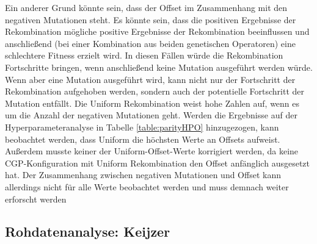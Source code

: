Ein anderer Grund könnte sein, dass der Offset im Zusammenhang mit den negativen Mutationen steht.
Es könnte sein, dass die positiven Ergebnisse der Rekombination mögliche positive Ergebnisse der Rekombination beeinflussen und anschließend (bei einer Kombination aus beiden genetischen Operatoren) eine schlechtere Fitness erzielt wird.
In diesen Fällen würde die Rekombination Fortschritte bringen, wenn anschließend keine Mutation ausgeführt werden würde.
Wenn aber eine Mutation ausgeführt wird, kann nicht nur der Fortschritt der Rekombination aufgehoben werden, sondern auch der potentielle Fortschritt der Mutation entfällt.
Die Uniform Rekombination weist hohe Zahlen auf, wenn es um die Anzahl der negativen Mutationen geht. 
Werden die Ergebnisse auf der Hyperparameteranalyse in Tabelle \ref{table:parityHPO} hinzugezogen, kann beobachtet werden, dass Uniform die höchsten Werte an Offsets aufweist.
Außerdem musste keiner der Uniform-Offset-Werte korrigiert werden, da keine CGP-Konfiguration mit Uniform Rekombination den Offset anfänglich ausgesetzt hat.
Der Zusammenhang zwischen negativen Mutationen und Offset kann allerdings nicht für alle Werte beobachtet werden und muss demnach weiter erforscht werden

\subsection{Rohdatenanalyse: Keijzer}
\label{subsec:rohdatenKeijzer}

